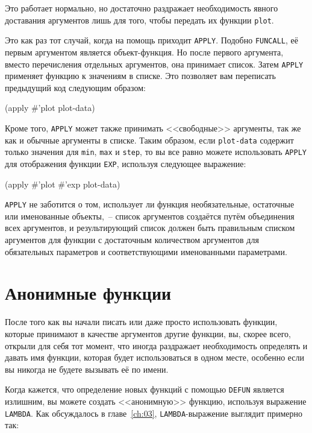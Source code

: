 Это работает нормально, но достаточно раздражает необходимость явного доставания
аргументов лишь для того, чтобы передать их функции \lstinline{plot}.

Это как раз тот случай, когда на помощь приходит \lstinline{APPLY}.  Подобно \lstinline{FUNCALL}, её
первым аргументом является объект-функция.  Но после первого аргумента, вместо
перечисления отдельных аргументов, она принимает список.  Затем \lstinline{APPLY} применяет
функцию к значениям в списке.  Это позволяет вам переписать предыдущий код следующим
образом:

\begin{myverb}
(apply #'plot plot-data)
\end{myverb}

Кроме того, \lstinline{APPLY} может также принимать <<свободные>> аргументы, так же как и обычные
аргументы в списке. Таким образом, если \lstinline{plot-data} содержит только значения для
\lstinline{min}, \lstinline{max} и \lstinline{step}, то вы все равно можете использовать \lstinline{APPLY} для
отображения функции \lstinline{EXP}, используя следующее выражение:

\begin{myverb}
(apply #'plot #'exp plot-data)
\end{myverb}

\lstinline{APPLY} не заботится о том, использует ли функция необязательные, остаточные или
именованные объекты,~-- список аргументов создаётся путём объединения всех аргументов, и
результирующий список должен быть правильным списком аргументов для функции с достаточным
количеством аргументов для обязательных параметров и соответствующими именованными
параметрами.

\section{Анонимные функции}

После того как вы начали писать или даже просто использовать функции, которые принимают в
качестве аргументов другие функции, вы, скорее всего, открыли для себя тот момент, что
иногда раздражает необходимость определять и давать имя функции, которая будет
использоваться в одном месте, особенно если вы никогда не будете вызывать её по имени.

Когда кажется, что определение новых функций с помощью \lstinline{DEFUN} является излишним, вы
можете создать <<анонимную>> функцию, используя выражение \lstinline{LAMBDA}.  Как обсуждалось в
главе~\ref{ch:03}, \lstinline{LAMBDA}-выражение выглядит примерно так:

